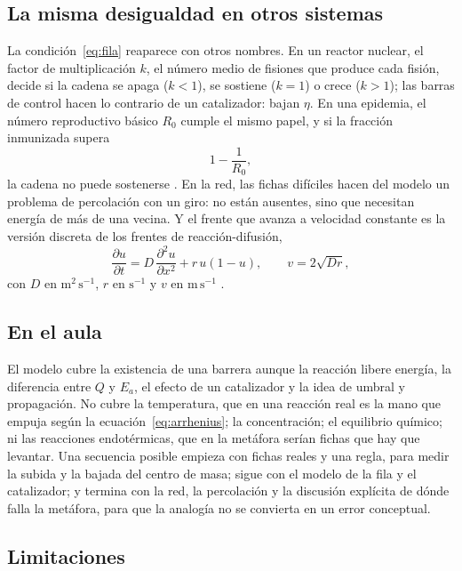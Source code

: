 \documentclass[11pt,a4paper]{article}
\begin{document}
\subsection{La misma desigualdad en otros sistemas}

La condición~\eqref{eq:fila} reaparece con otros nombres. En un reactor nuclear, el factor de multiplicación $k$, el número medio de fisiones que produce cada fisión, decide si la cadena se apaga ($k < 1$), se sostiene ($k = 1$) o crece ($k > 1$); las barras de control hacen lo contrario de un catalizador: bajan $\eta$. En una epidemia, el número reproductivo básico $R_0$ cumple el mismo papel, y si la fracción inmunizada supera
\begin{equation}\label{eq:rebano}
1 - \frac{1}{R_0} ,
\end{equation}
la cadena no puede sostenerse \parencite{kermack1927}. En la red, las fichas difíciles hacen del modelo un problema de percolación con un giro: no están ausentes, sino que necesitan energía de más de una vecina. Y el frente que avanza a velocidad constante es la versión discreta de los frentes de reacción-difusión,
\begin{equation}\label{eq:fisher}
\frac{\partial u}{\partial t} = D\,\frac{\partial^2 u}{\partial x^2} + r\,u(1-u), \qquad v = 2\sqrt{D r},
\end{equation}
con $D$ en $\mathrm{m^2\,s^{-1}}$, $r$ en $\mathrm{s^{-1}}$ y $v$ en $\mathrm{m\,s^{-1}}$ \parencite{fisher1937}.

\subsection{En el aula}

El modelo cubre la existencia de una barrera aunque la reacción libere energía, la diferencia entre $Q$ y $E_a$, el efecto de un catalizador y la idea de umbral y propagación. No cubre la temperatura, que en una reacción real es la mano que empuja según la ecuación~\eqref{eq:arrhenius}; la concentración; el equilibrio químico; ni las reacciones endotérmicas, que en la metáfora serían fichas que hay que levantar. Una secuencia posible empieza con fichas reales y una regla, para medir la subida y la bajada del centro de masa; sigue con el modelo de la fila y el catalizador; y termina con la red, la percolación y la discusión explícita de dónde falla la metáfora, para que la analogía no se convierta en un error conceptual.

\subsection{Limitaciones}
\end{document}
